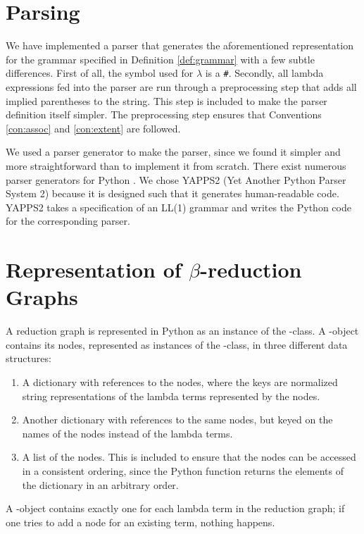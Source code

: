 \section{Parsing}

We have implemented a parser that generates the aforementioned representation
for the grammar specified in Definition \ref{def:grammar} with a few subtle
differences. First of all, the symbol used for $\lambda$ is a \texttt{\#}.
Secondly, all lambda expressions fed into the parser are run through a
preprocessing step that adds all implied parentheses to the string. This step
is included to make the parser definition itself simpler. The preprocessing
step ensures that Conventions \ref{con:assoc} and \ref{con:extent} are
followed.

We used a parser generator to make the parser, since we found it simpler and
more straightforward than to implement it from scratch. There exist numerous
parser generators for Python \cite{pythonParserGeneratorList}. We chose YAPPS2
(Yet Another Python Parser System 2) \cite{YAPPS2} because it is designed such
that it generates human-readable code. YAPPS2 takes a specification of an
LL(1) grammar and writes the Python code for the corresponding parser.

\section{Representation of $\beta$-reduction Graphs}

A reduction graph is represented in Python as an instance of the
-class. A -object contains its nodes, represented
as instances of the -class, in three different data structures:
\begin{enumerate}
	\item A dictionary with references to the nodes, where the keys are normalized string 
	representations of the lambda terms represented by the nodes.
	
	\item Another dictionary with references to the same nodes, but keyed on the
	names of the nodes instead of the lambda terms.
	
	\item A list of the nodes. This is included to ensure that the nodes can be
	accessed in a consistent ordering, since the Python function 
	returns the elements of the dictionary in an arbitrary order.
\end{enumerate}
A -object contains exactly one  for each lambda
term in the reduction graph; if one tries to add a node for an existing term,
nothing happens.

